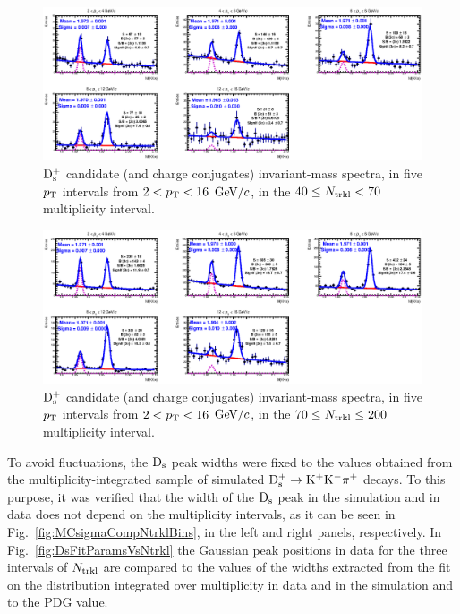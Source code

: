 \begin{figure}[htpb]
\centering
 \includegraphics[width=1\textwidth]{FigCap6/DsMass_4070Trkl.eps}
  \caption{${\rm D_s^+}$ candidate (and charge conjugates) invariant-mass spectra, in five $p_{\rm T}$ intervals from $2 < p_{\rm T} < 16$ $\mathrm{GeV}/c$, in the $40 \leq N_{\rm trkl} < 70$ multiplicity interval.}
 \label{fig:DsInvMassVsNtrkl_2}
\end{figure}
\begin{figure}[htpb]
\centering
 \includegraphics[width=1\textwidth]{FigCap6/DsMass_70200Trkl.eps}
  \caption{${\rm D_s^+}$ candidate (and charge conjugates) invariant-mass spectra, in five $p_{\rm T}$ intervals from $2 < p_{\rm T} < 16$ $\mathrm{GeV}/c$, in the $70 \leq N_{\rm trkl} \leq 200$ multiplicity interval.}
 \label{fig:DsInvMassVsNtrkl_3}
\end{figure}
To avoid fluctuations, the ${\rm D_s}$ peak widths were fixed to the values obtained from the 
multiplicity-integrated sample of simulated ${\rm D^{+}_\mathrm{s}\to K^+ K^-\pi^+}$ decays. To this purpose, it was verified that the
width of the ${\rm D_s}$ peak in the simulation and in data does not depend on the multiplicity intervals, as it can be seen in Fig.~\ref{fig:MCsigmaCompNtrklBins}, in the left and right panels, respectively. 
In Fig.~\ref{fig:DsFitParamsVsNtrkl} the Gaussian peak positions  
in data for the three intervals of $N_{\rm trkl}$ are compared to the values of the widths extracted from the fit 
on the distribution integrated over multiplicity in data and in the simulation and to the PDG value.
